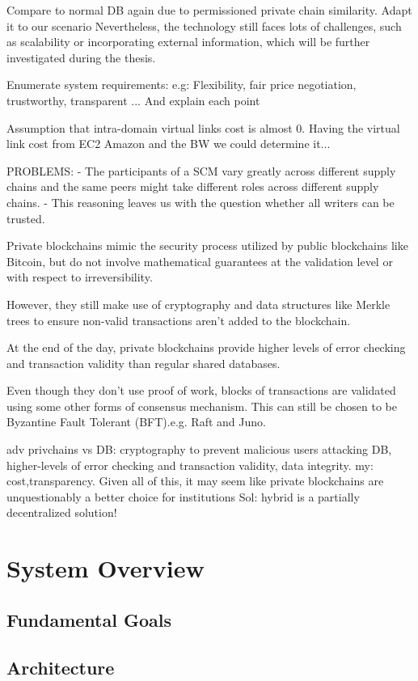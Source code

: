 Compare to normal DB again due to permissioned private chain similarity.
Adapt it to our scenario
Nevertheless, the technology still faces lots of challenges, such as scalability or incorporating external information, which will be further investigated during the thesis.

Enumerate system requirements: e.g: Flexibility, fair price negotiation, trustworthy, transparent ... And explain each point

Assumption that intra-domain virtual links cost is almost 0. Having the virtual link cost from EC2 Amazon and the BW we could determine it...

PROBLEMS: -  The participants of a SCM vary greatly across different supply
chains and the same peers might take different roles across different supply chains. - This reasoning leaves us with the question whether all writers
can be trusted. 

Private blockchains mimic the security process utilized by public blockchains like Bitcoin, but do not involve mathematical guarantees at the validation level or with respect to irreversibility. 

However, they still make use of cryptography and data structures like Merkle trees to ensure non-valid transactions aren’t added to the blockchain. 

At the end of the day, private blockchains provide higher levels of error checking and transaction validity than regular shared databases. 

Even though they don’t use proof of work, blocks of transactions are validated using some other forms of consensus mechanism. This can still be chosen to be Byzantine Fault Tolerant (BFT).e.g. Raft and Juno.

adv privchains vs DB: cryptography to prevent malicious users attacking DB, higher-levels of error checking and transaction validity, data integrity.
my: cost,transparency.
Given all of this, it may seem like private blockchains are unquestionably a better choice for institutions
Sol: hybrid is a partially decentralized solution!
\section{System Overview}

\subsection{Fundamental Goals}

\subsection{Architecture}

